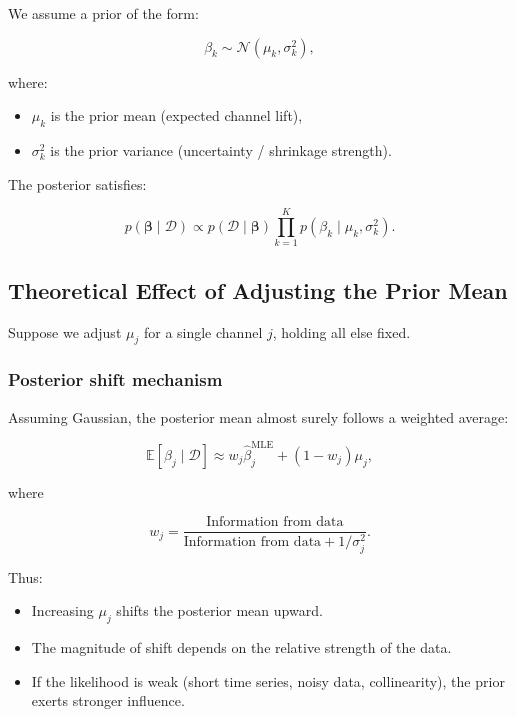 \documentclass{article}
\begin{document}
We assume a prior of the form:

\begin{equation}
\beta_k \sim \mathcal{N}(\mu_k, \sigma_k^2),
\end{equation}

where:
\begin{itemize}
\item $\mu_k$ is the prior mean (expected channel lift),
\item $\sigma_k^2$ is the prior variance (uncertainty / shrinkage strength).
\end{itemize}

The posterior satisfies:

\begin{equation}
p(\boldsymbol{\beta} \mid \mathcal{D}) \propto 
p(\mathcal{D} \mid \boldsymbol{\beta}) 
\prod_{k=1}^K p(\beta_k \mid \mu_k, \sigma_k^2).
\end{equation}

\subsection{Theoretical Effect of Adjusting the Prior Mean}

Suppose we adjust $\mu_j$ for a single channel $j$, holding all else fixed.

\subsubsection*{Posterior shift mechanism}

Assuming Gaussian, the posterior mean almost surely follows a weighted average:

\begin{equation}
\mathbb{E}[\beta_j \mid \mathcal{D}] 
\approx 
w_j \hat{\beta}_j^{\text{MLE}} 
+ (1 - w_j)\mu_j,
\end{equation}

where

\begin{equation}
w_j = 
\frac{\text{Information from data}}{\text{Information from data} + 1/\sigma_j^2}.
\end{equation}

Thus:

\begin{itemize}
\item Increasing $\mu_j$ shifts the posterior mean upward.
\item The magnitude of shift depends on the relative strength of the data.
\item If the likelihood is weak (short time series, noisy data, collinearity), the prior exerts stronger influence.
\end{itemize}
\end{document}
